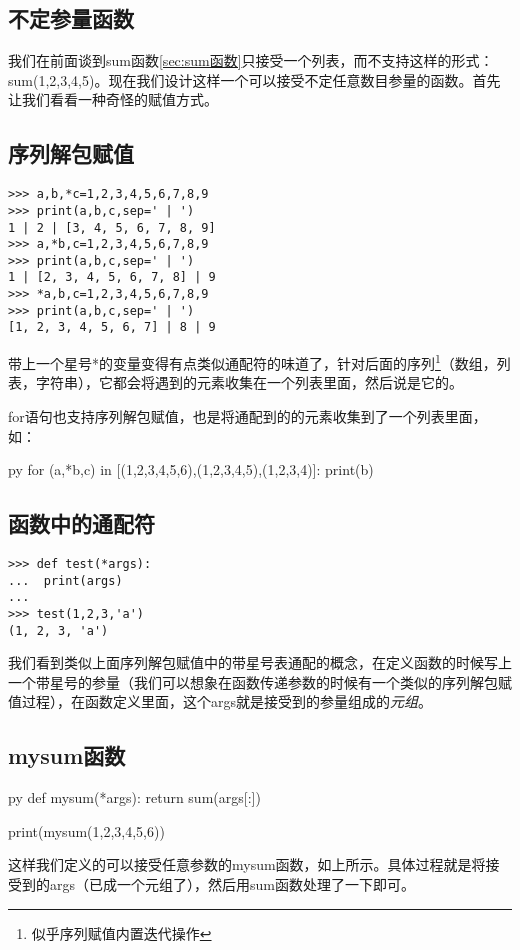 \documentclass[12pt,oneside]{book}
\begin{document}
\begin{common-format}
\section{不定参量函数}
我们在前面谈到sum函数\ref{sec:sum函数}只接受一个列表，而不支持这样的形式：sum(1,2,3,4,5)。现在我们设计这样一个可以接受不定任意数目参量的函数。首先让我们看看一种奇怪的赋值方式。

\subsection{序列解包赋值}
\label{sec:序列解包赋值}
\begin{Verbatim}
>>> a,b,*c=1,2,3,4,5,6,7,8,9
>>> print(a,b,c,sep=' | ')
1 | 2 | [3, 4, 5, 6, 7, 8, 9]
>>> a,*b,c=1,2,3,4,5,6,7,8,9
>>> print(a,b,c,sep=' | ')
1 | [2, 3, 4, 5, 6, 7, 8] | 9
>>> *a,b,c=1,2,3,4,5,6,7,8,9
>>> print(a,b,c,sep=' | ')
[1, 2, 3, 4, 5, 6, 7] | 8 | 9
\end{Verbatim}
带上一个星号*的变量变得有点类似通配符的味道了，针对后面的序列\footnote{似乎序列赋值内置迭代操作}（数组，列表，字符串），它都会将遇到的元素收集在一个列表里面，然后说是它的。

for语句也支持序列解包赋值，也是将通配到的的元素收集到了一个列表里面，如：
\begin{xverbatim}[129]{py}
for (a,*b,c) in [(1,2,3,4,5,6),(1,2,3,4,5),(1,2,3,4)]:
    print(b)
\end{xverbatim}


\subsection{函数中的通配符}
\begin{Verbatim}
>>> def test(*args):
...  print(args)
... 
>>> test(1,2,3,'a')
(1, 2, 3, 'a')
\end{Verbatim}
我们看到类似上面序列解包赋值中的带星号表通配的概念，在定义函数的时候写上一个带星号的参量（我们可以想象在函数传递参数的时候有一个类似的序列解包赋值过程），在函数定义里面，这个args就是接受到的参量组成的\emph{元组}。


\subsection{mysum函数}
\begin{xverbatim}[129]{py}
def mysum(*args):
    return sum(args[:])

print(mysum(1,2,3,4,5,6))
\end{xverbatim}
这样我们定义的可以接受任意参数的mysum函数，如上所示。具体过程就是将接受到的args（已成一个元组了），然后用sum函数处理了一下即可。



\end{common-format}
\end{document}
